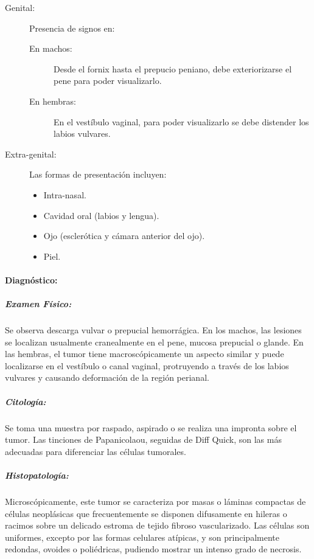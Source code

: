             \begin{description}
                \item[Genital:] Presencia de signos en:
                \begin{description}
                    \item[En machos:] Desde el fornix hasta el prepucio peniano, debe exteriorizarse el pene para poder visualizarlo.
                    \item[En hembras:] En el vestíbulo vaginal, para poder visualizarlo se debe distender los labios vulvares.
                \end{description}
                \item[Extra-genital:] Las formas de presentación incluyen:
                \begin{itemize}
                    \item Intra-nasal.
                    \item Cavidad oral (labios y lengua).
                    \item Ojo (esclerótica y cámara anterior del ojo).
                    \item Piel.
                \end{itemize}
            \end{description}

            \paragraph{Diagnóstico:}

            \subparagraph{Examen Físico:} Se observa descarga vulvar o prepucial hemorrágica. En los machos, las lesiones se localizan usualmente cranealmente en el pene, mucosa prepucial o glande. En las hembras, el tumor tiene macroscópicamente un aspecto similar y puede localizarse en el vestíbulo o canal vaginal, protruyendo a través de los labios vulvares y causando deformación de la región perianal.

            \subparagraph{Citología:} Se toma una muestra por raspado, aspirado o se realiza una impronta sobre el tumor. Las tinciones de Papanicolaou, seguidas de Diff Quick, son las más adecuadas para diferenciar las células tumorales.

            \subparagraph{Histopatología:} Microscópicamente, este tumor se caracteriza por masas o láminas compactas de células neoplásicas que frecuentemente se disponen difusamente en hileras o racimos sobre un delicado estroma de tejido fibroso vascularizado. Las células son uniformes, excepto por las formas celulares atípicas, y son principalmente redondas, ovoides o poliédricas, pudiendo mostrar un intenso grado de necrosis.

